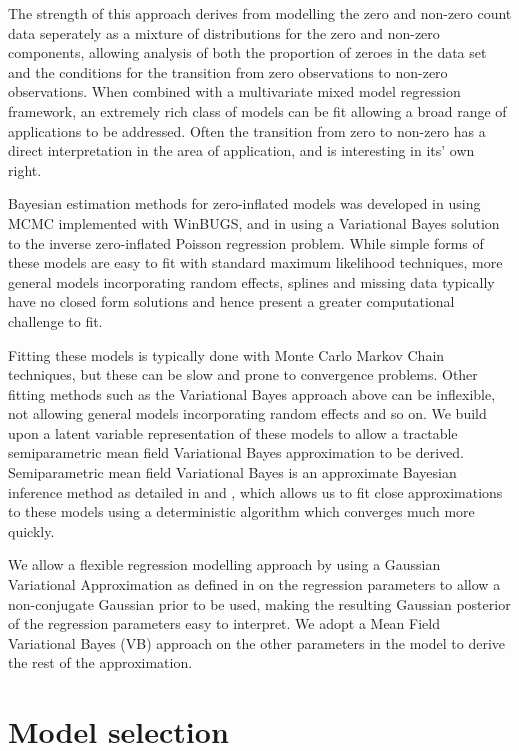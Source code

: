 \documentclass{amsart}[12pt]
\begin{document}
The strength of this approach derives from modelling the zero and non-zero count data seperately as a mixture
of distributions for the zero and non-zero components, allowing analysis of both the proportion of zeroes in
the data set and the conditions for the transition from zero observations to non-zero observations. When
combined with a multivariate mixed model regression framework, an extremely rich class of models can be fit
allowing a broad range of applications to be addressed. Often the transition from zero to non-zero has a
direct interpretation in the area of application, and is interesting in its' own right.

Bayesian estimation methods for zero-inflated models was developed in \citep{Ghosh2006} using MCMC 
implemented with WinBUGS, and in \citep{Vatsa2014} using a Variational Bayes solution to the inverse
zero-inflated Poisson regression problem. While simple forms of these models are easy to fit with standard 
maximum likelihood techniques, more general models incorporating random effects, splines and missing data 
typically have no closed form solutions and hence present a greater computational challenge to fit.

Fitting these models is typically done with Monte Carlo Markov Chain techniques, but these can be slow and
prone to convergence problems. Other fitting methods such as the Variational Bayes approach above can be
inflexible, not allowing general models incorporating random effects and so on. 
We build upon a latent variable representation of these models to allow a
tractable semiparametric mean field Variational Bayes approximation to be derived. Semiparametric mean field
Variational Bayes is an approximate Bayesian inference method as detailed in \citep{Ormerod2010} and
\citep{Rohde2015}, which allows us to fit close approximations to these models using a deterministic algorithm
which converges much more quickly.

We allow a flexible regression modelling approach by using a Gaussian Variational Approximation as defined in
\citep{Ormerod2012} on the regression parameters to allow a non-conjugate Gaussian prior to be used, making the
resulting Gaussian posterior of the regression parameters easy to interpret. We adopt a Mean Field Variational
Bayes (VB) approach on the other parameters in the model to derive the rest of the approximation.

\section{Model selection}
\end{document}
